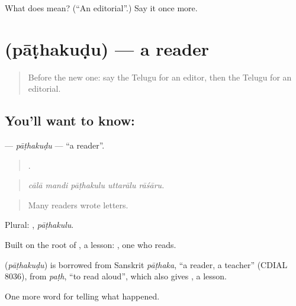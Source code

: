 \begin{tcolorbox}[breakable,colback=teal!4,colframe=teal!35!black,title={Before you move on}]
What does  mean? (\textquotedblleft{}An editorial\textquotedblright{}.) Say it once more.
\end{tcolorbox}
\section[\texorpdfstring{\te{పాఠకుడు} (pāṭhakuḍu)}{పాఠకుడు (pāṭhakuḍu)}]{ (pāṭhakuḍu) — a reader}

\label{lesson:TE-C341-pathakudu}



\begin{quote}
Before the new one: say the Telugu for an editor, then the Telugu for an editorial.
\end{quote}

\subsection*{You'll want to know: }
\textbf{} — \emph{pāṭhakuḍu} — \textquotedblleft{}a reader\textquotedblright{}.

\begin{quote}
    .
\end{quote}

\begin{quote}
\emph{cālā mandi pāṭhakulu uttarālu rāśāru.}
\end{quote}

\begin{quote}
Many readers wrote letters.
\end{quote}

Plural: , \emph{pāṭhakulu}.

Built on the root of , a lesson: , one who reads.

\begin{cousinweb}
\textbf{} (\emph{pāṭhakuḍu}) is borrowed from Sanskrit \emph{pāṭhaka}, \textquotedblleft{}a reader, a teacher\textquotedblright{} (CDIAL 8036), from \emph{paṭh}, \textquotedblleft{}to read aloud\textquotedblright{}, which also gives , a lesson.
\end{cousinweb}

\begin{grammarlens}[title={What you've built}]
One more word for telling what happened.
\end{grammarlens}

